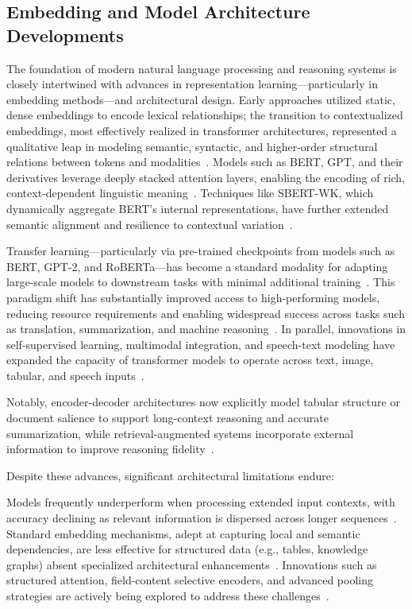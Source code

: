 \documentclass[sigconf]{acmart}
\begin{document}
\subsection{Embedding and Model Architecture Developments}

The foundation of modern natural language processing and reasoning systems is closely intertwined with advances in representation learning---particularly in embedding methods---and architectural design. Early approaches utilized static, dense embeddings to encode lexical relationships; the transition to contextualized embeddings, most effectively realized in transformer architectures, represented a qualitative leap in modeling semantic, syntactic, and higher-order structural relations between tokens and modalities~\cite{ref72,ref74,ref75,ref77}. Models such as BERT, GPT, and their derivatives leverage deeply stacked attention layers, enabling the encoding of rich, context-dependent linguistic meaning~\cite{ref100}. Techniques like SBERT-WK, which dynamically aggregate BERT’s internal representations, have further extended semantic alignment and resilience to contextual variation~\cite{ref74,ref75,ref77}.

Transfer learning---particularly via pre-trained checkpoints from models such as BERT, GPT-2, and RoBERTa---has become a standard modality for adapting large-scale models to downstream tasks with minimal additional training~\cite{ref100}. This paradigm shift has substantially improved access to high-performing models, reducing resource requirements and enabling widespread success across tasks such as translation, summarization, and machine reasoning~\cite{ref100}. In parallel, innovations in self-supervised learning, multimodal integration, and speech-text modeling have expanded the capacity of transformer models to operate across text, image, tabular, and speech inputs~\cite{ref72,ref77}.

Notably, encoder-decoder architectures now explicitly model tabular structure or document salience to support long-context reasoning and accurate summarization, while retrieval-augmented systems incorporate external information to improve reasoning fidelity~\cite{ref75,ref77,ref100}. 

Despite these advances, significant architectural limitations endure:

Models frequently underperform when processing extended input contexts, with accuracy declining as relevant information is dispersed across longer sequences~\cite{ref70}.
Standard embedding mechanisms, adept at capturing local and semantic dependencies, are less effective for structured data (e.g., tables, knowledge graphs) absent specialized architectural enhancements~\cite{ref77,ref100}.
Innovations such as structured attention, field-content selective encoders, and advanced pooling strategies are actively being explored to address these challenges~\cite{ref74,ref75,ref77,ref100}.
\end{document}
